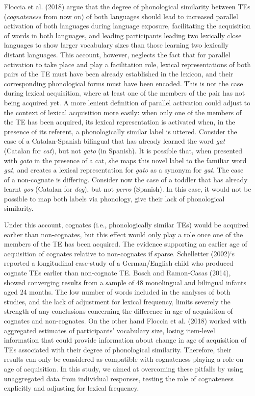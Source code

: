 \documentclass[
  english,
  man,man,floatsintext]{apa6}
\begin{document}
Floccia et al. (2018) argue that the degree of phonological similarity between TEs (\emph{cognateness} from now on) of both languages should lead to increased parallel activation of both languages during language exposure, facilitating the acquisition of words in both languages, and leading participants leading two lexically close languages to show larger vocabulary sizes than those learning two lexically distant languages. This account, however, neglects the fact that for parallel activation to take place and play a facilitation role, lexical representations of both pairs of the TE must have been already established in the lexicon, and their corresponding phonological forms must have been encoded. This is not the case during lexical acquisition, where at least one of the members of the pair has not being acquired yet. A more lenient definition of parallel activation could adjust to the context of lexical acquisition more easily: when only one of the members of the TE has been acquired, its lexical representation is activated when, in the presence of its referent, a phonologically similar label is uttered. Consider the case of a Catalan-Spanish bilingual that has already learned the word \emph{gat} (Catalan for \emph{cat}), but not \emph{gato} (in Spanish). It is possible that, when presented with \emph{gato} in the presence of a cat, she maps this novel label to the familiar word \emph{gat}, and creates a lexical representation for \emph{gato} as a synonym for \emph{gat}. The case of a non-cognate is differing. Consider now the case of a toddler that has already learnt \emph{gos} (Catalan for \emph{dog}), but not \emph{perro} (Spanish). In this case, it would not be possible to map both labels via phonology, give their lack of phonological similarity.

Under this account, cognates (i.e., phonologically similar TEs) would be acquired earlier than non-cognates, but this effect would only play a role once one of the members of the TE has been acquired. The evidence supporting an earlier age of acquisition of cognates relative to non-cognates if sparse. Schelletter (2002)`s reported a longitudinal case-study of a German/English child who produced cognate TEs earlier than non-cognate TE. Bosch and Ramon-Casas (2014), showed converging results from a sample of 48 monolingual and bilingual infants aged 24 months. The low number of words included in the analyses of both studies, and the lack of adjustment for lexical frequency, limits severely the strength of any conclusions concerning the difference in age of acquisition of cognates and non-cognates. On the other hand Floccia et al. (2018) worked with aggregated estimates of participants' vocabulary size, losing item-level information that could provide information about change in age of acquisition of TEs associated with their degree of phonological similarity. Therefore, their results can only be considered as compatible with cognateness playing a role on age of acquisition. In this study, we aimed at overcoming these pitfalls by using unaggregated data from individual responses, testing the role of cognateness explicitly and adjusting for lexical frequency.
\end{document}
